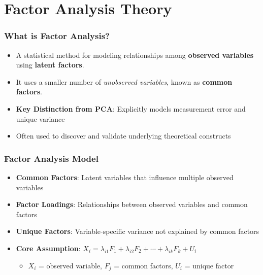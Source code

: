 \documentclass[aspectratio=169]{beamer}
\begin{document}
\section{Factor Analysis Theory}

\begin{frame}[fragile]
    \frametitle{What is Factor Analysis?}
    \begin{itemize}
        \item A statistical method for modeling relationships among \textbf{observed variables} using \textbf{latent factors}. \pause
        \item It uses a smaller number of \textit{unobserved variables}, known as \textbf{common factors}. \pause
        \item \textbf{Key Distinction from PCA}: Explicitly models measurement error and unique variance \pause
        \item Often used to discover and validate underlying theoretical constructs
    \end{itemize}
\end{frame}

\begin{frame}[fragile]
    \frametitle{Factor Analysis Model}
    \begin{itemize}
        \item \textbf{Common Factors}: Latent variables that influence multiple observed variables \pause
        \item \textbf{Factor Loadings}: Relationships between observed variables and common factors \pause
        \item \textbf{Unique Factors}: Variable-specific variance not explained by common factors \pause
        \item \textbf{Core Assumption}: $X_i = \lambda_{i1}F_1 + \lambda_{i2}F_2 + \cdots + \lambda_{ik}F_k + U_i$
              \begin{itemize}
                  \item $X_i$ = observed variable, $F_j$ = common factors, $U_i$ = unique factor
              \end{itemize}
    \end{itemize}
\end{frame}
\end{document}
